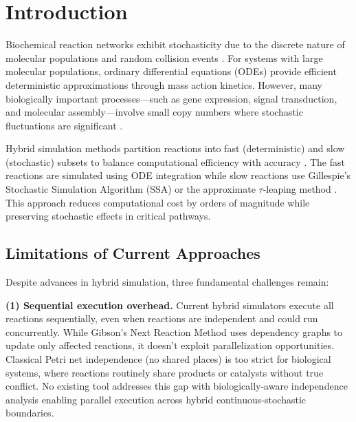 \documentclass{bioinfo}
\begin{document}
\maketitle

\section{Introduction}

Biochemical reaction networks exhibit stochasticity due to the discrete nature of molecular populations and random collision events \citep{gillespie1977exact}. For systems with large molecular populations, ordinary differential equations (ODEs) provide efficient deterministic approximations through mass action kinetics. However, many biologically important processes---such as gene expression, signal transduction, and molecular assembly---involve small copy numbers where stochastic fluctuations are significant \citep{elowitz2002stochastic}.

Hybrid simulation methods partition reactions into fast (deterministic) and slow (stochastic) subsets to balance computational efficiency with accuracy \citep{haseltine2002approximate}. The fast reactions are simulated using ODE integration while slow reactions use Gillespie's Stochastic Simulation Algorithm (SSA) or the approximate $\tau$-leaping method \citep{gillespie2001approximate}. This approach reduces computational cost by orders of magnitude while preserving stochastic effects in critical pathways.

\subsection{Limitations of Current Approaches}

Despite advances in hybrid simulation, three fundamental challenges remain:

\textbf{(1) Sequential execution overhead.} Current hybrid simulators execute all reactions sequentially, even when reactions are independent and could run concurrently. While Gibson's Next Reaction Method \citep{gibson2000efficient} uses dependency graphs to update only affected reactions, it doesn't exploit parallelization opportunities. Classical Petri net independence (no shared places) is too strict for biological systems, where reactions routinely share products or catalysts without true conflict. No existing tool addresses this gap with biologically-aware independence analysis enabling parallel execution across hybrid continuous-stochastic boundaries.
\end{document}
